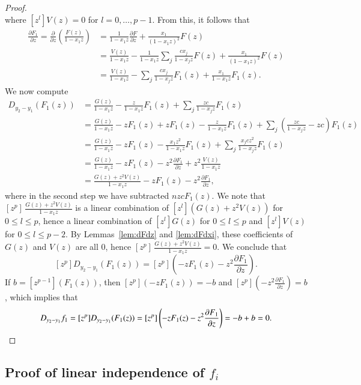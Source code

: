 \documentclass{elsarticle}
\numberwithin{equation}{section}
\theoremstyle{definition}
\begin{document}
\begin{proof}
\[\]
where $[z^l]V(z)=0$ for $l=0,\dots,p-1$. From this, it follows that
\begin{align*}
\frac{\partial F_1}{\partial z} = \frac{\partial}{\partial z}\left(\frac{F(z)}{1-x_1z}\right) &=\frac{1}{1-x_1z} \frac{\partial F}{\partial z}+\frac{x_1}{(1-x_1z)^2} F(z)\\
&=\frac{V(z)}{1-x_1z}-\frac{1}{1-x_1z}\sum_j \frac{cx_j}{1-x_jz}F(z)+\frac{x_1}{(1-x_1z)^2} F(z)\\
&=\frac{V(z)}{1-x_1z} - \sum_j \frac{cx_j}{1-x_jz}F_1(z)+\frac{x_1}{1-x_1z} F_1(z).
\end{align*}
We now compute
\begin{align*}
D_{y_2-y_1}(F_1(z))&=\frac{G(z)}{1-x_1z}-\frac{z}{1-x_1z}F_1(z)+\sum_{j} \frac{zc}{1-x_jz}F_1(z)\\
&=\frac{G(z)}{1-x_1z}-zF_1(z)+zF_1(z)-\frac{z}{1-x_1z}F_1(z) + \sum_{j} \left(\frac{zc}{1-x_jz} - zc\right) F_1(z)\\
&=\frac{G(z)}{1-x_1z}-zF_1(z)-\frac{x_1z^2}{1-x_1z}F_1(z)+\sum_{j} \frac{x_jcz^2}{1-x_jz}F_1(z)\\
&=\frac{G(z)}{1-x_1z}-zF_1(z)-z^2\frac{\partial F_1}{\partial z}+z^2\frac{V(z)}{1-x_1z}\\
&=\frac{G(z)+z^2V(z)}{1-x_1z}-zF_1(z)-z^2\frac{\partial F_1}{\partial z},
\end{align*}
where in the second step we have subtracted $n zc F_1(z)$.  We note that $[z^p]\,\frac{G(z)+z^2V(z)}{1-x_1z}$ is a linear combination of $[z^l](G(z)+z^2V(z))$ for $0 \le l \le p$, hence a linear combination of $[z^l]G(z)$ for $0 \le l \le p$ and $[z^l]V(z)$ for $0 \le l \le p-2$. By Lemmas~\ref{lem:dFdz} and \ref{lem:dFdxi}, these coefficients of $G(z)$ and $V(z)$ are all $0$, hence $[z^p]\,\frac{G(z)+z^2V(z)}{1-x_1z}=0$. We conclude that 
\[
[z^p]D_{y_2-y_1}(F_1(z))=[z^p]\left(-zF_1(z)-z^2\frac{\partial F_1}{\partial z}\right).
\]
If $b=[z^{p-1}](F_1(z))$, then $[z^p](-zF_1(z))=-b$ and $[z^p]\left(-z^2\frac{\partial F_1}{\partial z}\right)=b$, which implies that 
\[
D_{y_2 - y_1} f_1 = [z^p]D_{y_2-y_1}(F_1(z))= [z^p]\left(-zF_1(z)-z^2\frac{\partial F_1}{\partial z}\right) = -b + b = 0. \qedhere
\]
\end{proof}

\subsection{Proof of linear independence of $f_i$}
\end{document}
